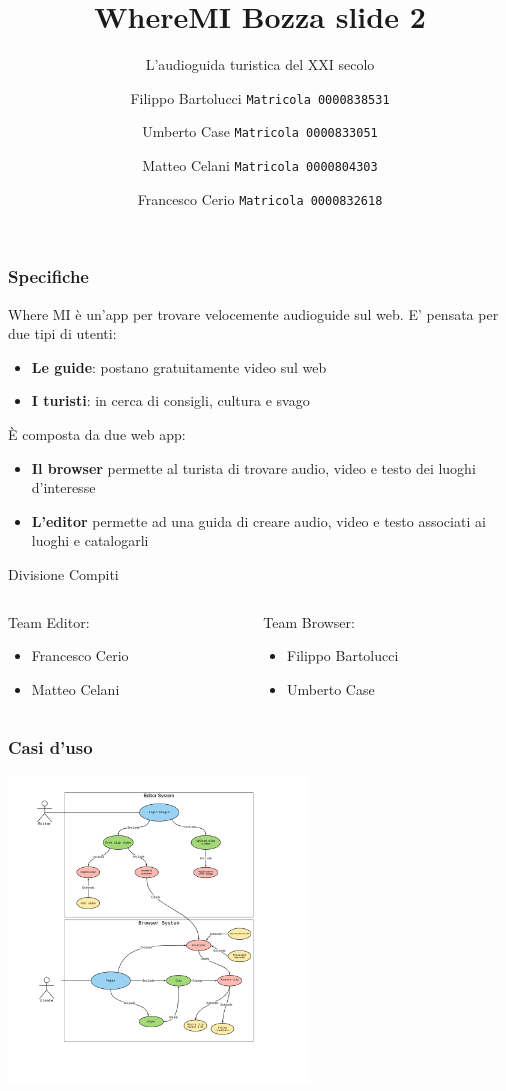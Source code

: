 \documentclass{beamer}
\title{WhereMI Bozza slide 2}
\subtitle{L'audioguida turistica del XXI secolo}
\author{
  Filippo Bartolucci
  \texttt{Matricola 0000838531}\\
  \and
  Umberto Case
  \texttt{Matricola 0000833051}\\
    \and
  Matteo Celani
  \texttt{Matricola 0000804303}\\
    \and
  Francesco Cerio
  \texttt{Matricola 0000832618}
 }
\institute{Università di Bologna}
\date{}
\begin{document}
\begin{frame}
\titlepage
\end{frame}

\begin{frame}
\frametitle{Specifiche}
Where MI è un'app per trovare velocemente audioguide sul web. E' pensata per due tipi di utenti:
\begin{itemize}
  \item \textbf{Le guide}: postano gratuitamente video sul web
  \item \textbf{I turisti}: in cerca di consigli, cultura e svago
\end{itemize}
\vspace{0.2cm}
È composta da due web app:
\begin{itemize}
  \item \textbf{Il browser} permette al turista di trovare audio, video e testo dei luoghi d'interesse
  \item \textbf{L'editor} permette ad una guida di creare audio, video e testo associati ai luoghi e catalogarli
\end{itemize}
\vspace{0.2cm}
\centering Divisione Compiti
\vspace{0.2cm}
  \begin{columns}
    \begin{column}{.48\textwidth} %
    Team Editor:
 \begin{itemize}
  \item Francesco Cerio
  \item Matteo Celani
\end{itemize}
    \end{column}
    \hfill
    \begin{column}{.48 \textwidth}
    Team Browser:
  \begin{itemize}
  \item Filippo Bartolucci
  \item Umberto Case
\end{itemize}
    \end{column}
  \end{columns}
\end{frame}

\begin{frame}
\frametitle{Casi d'uso}
	\centering \includegraphics[width=8cm]{Images/UML/UML3.png}
\end{frame}
\end{document}
